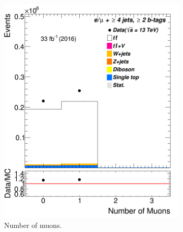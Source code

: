 \begin{figure}
	\begin{subfigure}{0.25\textwidth}
		\includegraphics[width=\linewidth]{ControlPlots_emujets_2016_4incl_2incl/mu_n_emujets_2016.png}
		\caption{Number of muons.} \label{fig:b2}
	\end{subfigure}\hspace*{1.0cm}
	\begin{subfigure}{0.25\textwidth}

\end{subfigure}
\end{figure}
